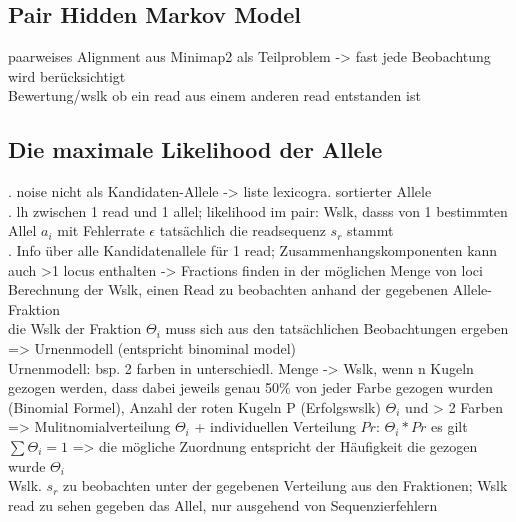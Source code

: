 \subsection{Pair Hidden Markov Model} \label{subsec:sol_phmm}
paarweises Alignment aus Minimap2 als Teilproblem -> fast jede Beobachtung wird berücksichtigt\\
Bewertung/wslk ob ein read aus einem anderen read entstanden ist\\
\subsection{Die maximale Likelihood der Allele}
. noise nicht als Kandidaten-Allele -> liste lexicogra. sortierter Allele\\

. lh zwischen 1 read und 1 allel; likelihood im pair: Wslk, dasss von 1 bestimmten Allel $a_{i}$ mit Fehlerrate $\epsilon$ tatsächlich die readsequenz $s_{r}$ stammt \\

. Info über alle Kandidatenallele für 1 read; Zusammenhangskomponenten kann auch >1 locus enthalten -> Fractions finden in der möglichen Menge von loci \\
Berechnung der Wslk, einen Read zu beobachten anhand der gegebenen Allele-Fraktion\\
die Wslk der Fraktion $\Theta_{i}$ muss sich aus den tatsächlichen Beobachtungen ergeben => Urnenmodell (entspricht binominal model)\\
Urnenmodell: bsp. 2 farben in unterschiedl. Menge -> Wslk, wenn n Kugeln gezogen werden, dass dabei jeweils genau 50\% von jeder Farbe gezogen wurden (Binomial Formel), Anzahl der roten Kugeln P (Erfolgswslk) $\Theta_{i}$ und  > 2 Farben => Mulitnomialverteilung $\Theta_{i}$ + individuellen Verteilung $Pr$: $\Theta_{i} * Pr$
es gilt $\sum \Theta_{i} = 1$ => die mögliche Zuordnung entspricht der Häufigkeit die gezogen wurde $\Theta_{i}$ \\
Wslk. $ s_{r} $ zu beobachten unter der gegebenen Verteilung aus den Fraktionen; Wslk read zu sehen gegeben das Allel, nur ausgehend von Sequenzierfehlern \\

